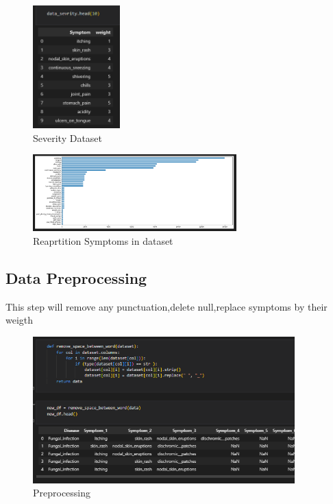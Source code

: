 \begin{figure}[htp]
    \centering
    \includegraphics[width=0.3\textwidth]{images/dataseverity.png}
    \caption{Severity Dataset }
    \label{fig:example5}
\end{figure}

\begin{figure}[htp]
    \centering
    \includegraphics[width=0.7\textwidth]{images/dataset.png}
    \caption{Reaprtition Symptoms in dataset}
    \label{fig:example5}
\end{figure}


\subsection{Data Preprocessing}
\label{sec:Data Preprocessing}

This step will remove any punctuation,delete null,replace symptoms by their weigth
\begin{figure}[htp]
    \centering
    \includegraphics[width=0.9\textwidth]{images/preprocessing.png}
    \caption{Preprocessing}
    \label{fig:example}
\end{figure}


